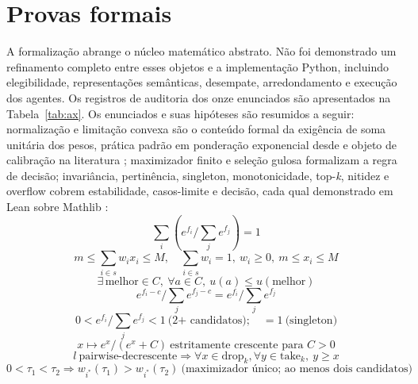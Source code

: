 \chapter{Provas formais}\label{cap:provas}
A formalização abrange o núcleo matemático abstrato. Não foi demonstrado um refinamento completo entre esses objetos e a implementação Python, incluindo elegibilidade, representações semânticas, desempate, arredondamento e execução dos agentes. Os registros de auditoria dos onze enunciados são apresentados na Tabela~\ref{tab:ax}.
Os enunciados e suas hipóteses são resumidos a seguir: normalização e limitação convexa são o conteúdo formal da exigência de soma unitária dos pesos, prática padrão em ponderação exponencial desde \cite{vaswani2017} e objeto de calibração na literatura \cite{komisarenko2024,xuan2025}; maximizador finito e seleção gulosa formalizam a regra de decisão; invariância, pertinência, singleton, monotonicidade, top-\textit{k}, nitidez e overflow cobrem estabilidade, casos-limite e decisão, cada qual demonstrado em Lean sobre Mathlib \cite{moura2021,mathlib2020}:
\begin{equation*}
\sum_i\left(e^{f_i}/\sum_j e^{f_j}\right)=1 \tag{T1}
\end{equation*}
\begin{equation*}
m\leq\sum_{i\in s}w_ix_i\leq M,\quad \sum_{i\in s}w_i=1,\ w_i\geq0,\ m\leq x_i\leq M \tag{T2/T6}
\end{equation*}
\begin{equation*}
\exists\,\text{melhor}\in C,\ \forall a\in C,\ u(a)\leq u(\text{melhor}) \tag{T3}
\end{equation*}
\begin{equation*}
e^{f_i-c}/\sum_j e^{f_j-c}=e^{f_i}/\sum_j e^{f_j} \tag{T4}
\end{equation*}
\begin{equation*}
0<e^{f_i}/\sum_j e^{f_j}<1\ \text{(2+ candidatos)};\quad =1\ \text{(singleton)} \tag{T5/T7}
\end{equation*}
\begin{equation*}
x\mapsto e^x/(e^x+C)\ \text{estritamente crescente para }C>0 \tag{T8}
\end{equation*}
\begin{equation*}
l\ \text{pairwise-decrescente}\Rightarrow\forall x\in\text{drop}_k,\forall y\in\text{take}_k,\ y\geq x \tag{T9}
\end{equation*}
\begin{equation*}
0<\tau_1<\tau_2\Rightarrow w_{i^*}(\tau_1)>w_{i^*}(\tau_2)\ \text{(maximizador único; ao menos dois candidatos)} \tag{T10}
\end{equation*}
